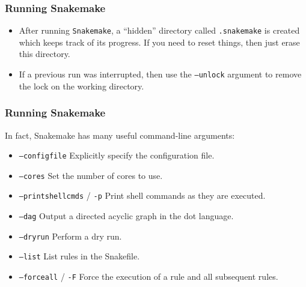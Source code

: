 \begin{frame}

\frametitle{Running Snakemake}

\begin{itemize}
  \item After running {\texttt{Snakemake}}, a ``hidden'' directory called {\texttt{.snakemake}} is created which keeps track of its progress.  If you need to reset things, then just erase this directory.
  \item If a previous run was interrupted, then use the {\texttt{--unlock}} argument to remove the lock on the working directory.
\end{itemize}

\end{frame}


\begin{frame}

\frametitle{Running Snakemake}

In fact, Snakemake has many useful command-line arguments:
    \begin{itemize}
      \item {\texttt{--configfile}}  Explicitly specify the configuration file.
      \item {\texttt{--cores}}  Set the number of cores to use.
      \item {\texttt{--printshellcmds}} / {\texttt{-p}}  Print shell commands as they are executed.
      \item {\texttt{--dag}}  Output a directed acyclic graph in the dot language.
      \item {\texttt{--dryrun}}  Perform a dry run.
      \item {\texttt{--list}}  List rules in the Snakefile.
      \item {\texttt{--forceall}} / {\texttt{-F}}  Force the execution of a rule and all subsequent rules.
    \end{itemize}

\end{frame}

